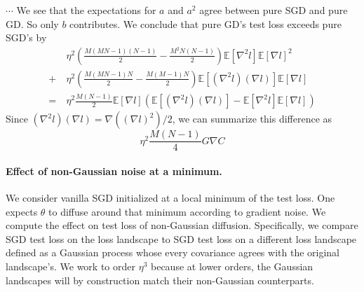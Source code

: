 \documentclass[openany, notitlepage, justified]{tufte-book}
\theoremstyle{plain}
\theoremstyle{definition}
\newcommand{\wrap}[1]{\left(#1\right)}
\newcommand{\expct}[1]{\mathbb{E}\left[#1\right]}
\begin{document}
            \newpage
            \begin{shaded}
                $\cdots$ We see that the expectations for $a$ and $a^2$ agree
                between pure SGD and pure GD.  So only $b$ contributes.  We
                conclude that pure GD's test loss exceeds pure SGD's by
                \begin{align*}
                       ~&\eta^2
                        \wrap{\frac{M(MN-1)(N-1)}{2}  - \frac{M^2N(N-1)}{2}}
                        \expct{\nabla^2 l} \expct{\nabla l}^2 \\
                    +   ~&\eta^2 
                        \wrap{\frac{M(MN-1)N}{2} - \frac{M(M-1)N}{2}}
                        \expct{(\nabla^2 l) (\nabla l)} \expct{\nabla l} \\
                    = 
                        ~&\eta^2     \frac{M(N-1)}{2}
                    \expct{\nabla l} \wrap{
                          \expct{(\nabla^2 l) (\nabla l)}
                        - \expct{\nabla^2 l} \expct{\nabla l}
                    }
                \end{align*}
                Since $(\nabla^2 l) (\nabla l) = \nabla((\nabla l)^2)/2$, we can 
                summarize this difference as
                $$
                    \eta^2 \frac{M(N-1)}{4}
                    G \nabla C 
                $$
            \end{shaded}

        \paragraph{Effect of non-Gaussian noise at a minimum.}
            We consider vanilla SGD initialized at a local minimum of the test loss.
            One expects $\theta$ to diffuse around that minimum according to
            gradient noise.  We compute the effect on test loss of non-Gaussian
            diffusion.  Specifically, we compare SGD test loss on the loss
            landscape to SGD test loss on a different loss landscape defined as a
            Gaussian process whose every covariance agrees with the original
            landscape's.  We work to order $\eta^3$ because at lower orders,
            the Gaussian landscapes will by construction match their non-Gaussian
            counterparts.
\end{document}
